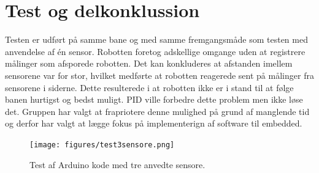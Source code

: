 \section{Test og delkonklussion}
Testen er udført på samme bane og med samme fremgangsmåde som testen med anvendelse af én sensor. Robotten foretog adskellige omgange uden at registrere målinger som afsporede robotten. Det kan konkluderes at afstanden imellem sensorene var for stor, hvilket medførte at robotten reagerede sent på målinger fra sensorene i siderne. Dette resulterede i at robotten ikke er i stand til at følge banen hurtigst og bedst muligt. 
PID ville forbedre dette problem men ikke løse det. Gruppen har valgt at frapriotere denne mulighed på grund af manglende tid og derfor har valgt at lægge fokus på implementerign af software til embedded. 



\begin{figure}[h!]
  \centering
  \texttt{[image: figures/test3sensore.png]}
  \caption{Test af Arduino kode med tre anvedte sensore.}
  \label{test_3_sensore}
\end{figure}










